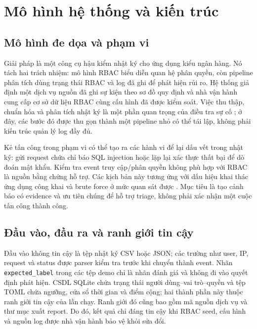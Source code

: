 \section{Mô hình hệ thống và kiến trúc}
\label{sec:system-model}

\subsection{Mô hình đe dọa và phạm vi}
\label{subsec:threat-model}

Giải pháp là một công cụ hậu kiểm nhật ký cho ứng dụng kiểu ngân hàng. Nó tách
hai trách nhiệm: mô hình RBAC biểu diễn quan hệ phân quyền, còn pipeline phân
tích dùng trạng thái RBAC và log đã ghi để phát hiện rủi ro. Hệ thống giả định
một dịch vụ nguồn đã ghi sự kiện theo sơ đồ quy định và nhà vận hành cung cấp cơ
sở dữ liệu RBAC cùng cấu hình đã được kiểm soát. Việc thu thập, chuẩn hóa và
phân tích nhật ký là một phần quan trọng của điều tra sự cố
\citep{Kent2006SP80092}; ở đây, các bước đó được thu gọn thành một pipeline
nhỏ có thể tái lập, không phải kiến trúc quản lý log đầy đủ.

Kẻ tấn công trong phạm vi có thể tạo ra các hành vi để lại dấu vết trong nhật
ký: gửi request chứa chỉ báo SQL injection hoặc lặp lại xác thực thất bại để dò
đoán mật khẩu. Kiểm tra event truy cập/phân quyền không phù hợp với RBAC là
nguồn bằng chứng hỗ trợ. Các kịch bản này tương ứng với dấu hiệu khai thác ứng
dụng công khai và brute force ở mức quan sát được
\citep{OWASPSQLi,MITRET1190,MITRET1110}. Mục tiêu là tạo cảnh báo có evidence
và ưu tiên chúng để hỗ trợ triage, không phải xác nhận một cuộc tấn công thành
công.

\subsection{Đầu vào, đầu ra và ranh giới tin cậy}
\label{subsec:trust-boundary}

Đầu vào không tin cậy là tệp nhật ký CSV hoặc JSON; các trường như user, IP,
request và status được parser kiểm tra trước khi chuyển thành event. Nhãn
\texttt{expected\_label} trong các tệp demo chỉ là nhãn đánh giá và không đi
vào quyết định phát hiện. CSDL SQLite chứa trạng thái người dùng--vai trò--quyền
và tệp TOML chứa ngưỡng, cửa sổ thời gian và điểm cộng; hai thành phần này thuộc
ranh giới tin cậy của lần chạy. Ranh giới đó cũng bao gồm mã nguồn dịch vụ và thư
mục xuất report. Do đó, kết quả chỉ đáng tin cậy khi RBAC seed, cấu hình và
nguồn log được nhà vận hành bảo vệ khỏi sửa đổi.

